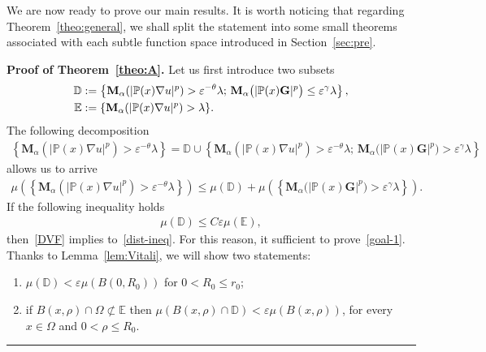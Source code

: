 \documentclass[a4paper, 11pt]{article}
\newenvironment{proof}[1][Proof]{\textbf{#1.} }{\hfill\rule{0.5em}{0.5em}}
\begin{document}
We are now ready to prove our main results. It is worth noticing that regarding Theorem~\ref{theo:general}, we shall split the statement into some small theorems associated with each subtle function space introduced in Section~\ref{sec:pre}.

\begin{proof}[Proof of Theorem~\ref{theo:A}]
Let us first introduce two subsets
\begin{align}\notag %
\mathbb{D} & := \left\{\mathbf{M}_{\alpha}(|\mathbb{P}(x)\nabla u|^{p}) > \varepsilon^{-\theta} \lambda; \, \mathbf{M}_{\alpha}\big(|\mathbb{P}(x) \mathbf{G}|^{p}\big) \le \varepsilon^{\gamma} \lambda\right\},\\
\mathbb{E} & := \{\mathbf{M}_{\alpha}(|\mathbb{P}(x)\nabla u|^{p}) > \lambda\}.\notag
\end{align}
The following decomposition
\begin{align*}
\left\{\mathbf{M}_{\alpha}(|\mathbb{P}(x)\nabla u|^{p}) > \varepsilon^{-\theta} \lambda\right\} = \mathbb{D} \cup \left\{\mathbf{M}_{\alpha}(|\mathbb{P}(x)\nabla u|^{p}) > \varepsilon^{-\theta} \lambda; \, \mathbf{M}_{\alpha}\big(|\mathbb{P}(x) \mathbf{G}|^{p}\big) > \varepsilon^{\gamma} \lambda\right\}
\end{align*}
allows us to arrive
\begin{align}\label{DVF}
\mu\left(\left\{\mathbf{M}_{\alpha}(|\mathbb{P}(x)\nabla u|^{p}) > \varepsilon^{-\theta} \lambda\right\}\right) \le \mu(\mathbb{D}) + \mu\left(\left\{\mathbf{M}_{\alpha}\big(|\mathbb{P}(x) \mathbf{G}|^{p}\big) > \varepsilon^{\gamma} \lambda\right\}\right).
\end{align}
If the following inequality holds
\begin{align}\label{goal-1}
\mu(\mathbb{D}) \le C \varepsilon \mu(\mathbb{E}),
\end{align}
then~\eqref{DVF} implies to~\eqref{dist-ineq}. For this reason, it sufficient to prove~\eqref{goal-1}. Thanks to Lemma~\ref{lem:Vitali}, we will show two statements:
\begin{enumerate}
\item[i)] $\mu(\mathbb{D}) < \varepsilon \mu(B(0,R_0))$ for $0<R_0\le r_0$;
\item[ii)] if $B(x,\rho)\cap \Omega \not\subset \mathbb{E}$ then $\mu(B(x,\rho)\cap \mathbb{D}) < \varepsilon \mu(B(x,\rho))$, for every $x\in \Omega$ and $0<\rho \le R_0$.
\end{enumerate}


\end{proof}
\end{document}
